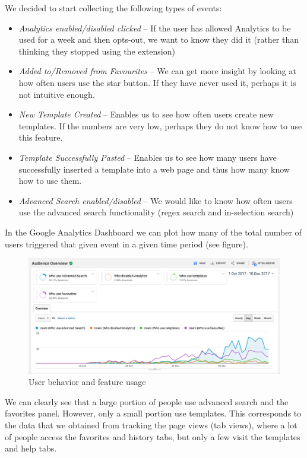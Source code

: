 \documentclass[bsc,frontabs,twoside,singlespacing,parskip,deptreport]{infthesis}
\providecommand{\tightlist}{%
  \setlength{\itemsep}{0pt}\setlength{\parskip}{0pt}}
\begin{document}
We decided to start collecting the following types of events:
\begin{itemize}
\tightlist
\item
  \textit{Analytics enabled/disabled clicked} -- If the user has allowed Analytics to be used for a week and then opts-out, we want to know they did it (rather than thinking they stopped using the extension)
\item
  \textit{Added to/Removed from Favourites} -- We can get more insight by looking at how often users use the star button. If they have never used it, perhaps it is not intuitive enough.
\item
  \textit{New Template Created} -- Enables us to see how often users create new templates. If the numbers are very low, perhaps they do not know how to use this feature.
\item
  \textit{Template Successfully Pasted} -- Enables us to see how many users have successfully inserted a template into a web page and thus how many know how to use them.
\item
  \textit{Advanced Search enabled/disabled} -- We would like to know how often users use the advanced search functionality (regex search and in-selection search)
\end{itemize}

In the Google Analytics Dashboard we can plot how many of the total number of users triggered that given event in a given time period (see figure).

\begin{figure}[h]
\centering
\includegraphics[width=1\textwidth]{../docs/user-behavior.png}
\caption{User behavior and feature usage}
\end{figure}

We can clearly see that a large portion of people use advanced search and the favorites panel. However, only a small portion use templates. This corresponds to the data that we obtained from tracking the page views (tab views), where a lot of people access the favorites and history tabs, but only a few visit the templates and help tabs.
\end{document}
